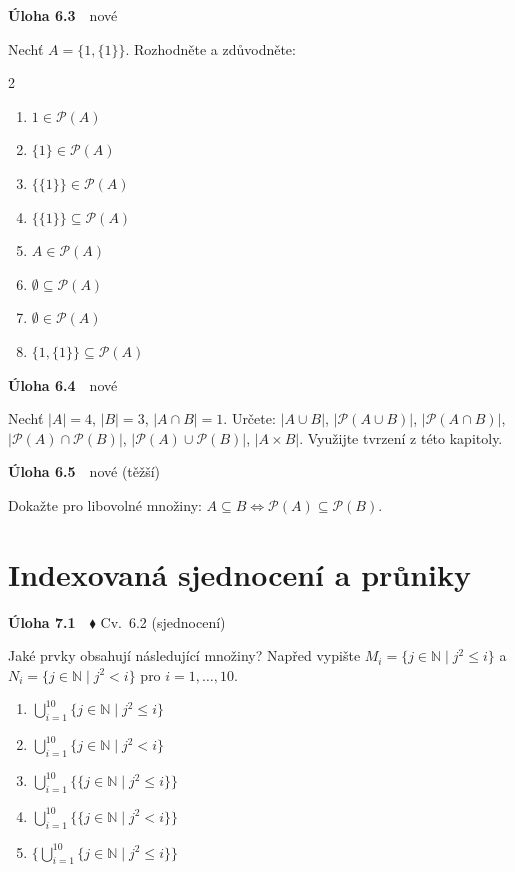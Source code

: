 \documentclass[11pt,a4paper]{article}
\newcommand{\N}{\mathbb N}\newcommand{\Z}{\mathbb Z}\newcommand{\Pot}{\mathcal P}
\newenvironment{pol}{\begin{enumerate}[label=(\alph*),leftmargin=2em,itemsep=3pt]}{\end{enumerate}}
\newenvironment{dvasl}{\begin{multicols}{2}\begin{enumerate}[label=(\alph*),leftmargin=2em,itemsep=3pt]}{\end{enumerate}\end{multicols}}
\newenvironment{uloha}[2]{\Needspace{6\baselineskip}\par\vspace{6pt}\noindent\textbf{Úloha #1}\ \ {\footnotesize\color{gray}#2}\par\vspace{2pt}}{\par\vspace{4pt}}
\begin{document}
\begin{uloha}{6.3}{nové}
Nechť $A=\{1,\{1\}\}$. Rozhodněte a zdůvodněte:
\begin{dvasl}
  \item $1\in\mathcal P(A)$
  \item $\{1\}\in\mathcal P(A)$
  \item $\{\{1\}\}\in\mathcal P(A)$
  \item $\{\{1\}\}\subseteq\mathcal P(A)$
  \item $A\in\mathcal P(A)$
  \item $\emptyset\subseteq\mathcal P(A)$
  \item $\emptyset\in\mathcal P(A)$
  \item $\{1,\{1\}\}\subseteq\mathcal P(A)$
\end{dvasl}

\end{uloha}

\begin{uloha}{6.4}{nové}
Nechť $|A|=4$, $|B|=3$, $|A\cap B|=1$. Určete: $|A\cup B|$, $|\mathcal P(A\cup B)|$, $|\mathcal P(A\cap B)|$, $|\mathcal P(A)\cap\mathcal P(B)|$, $|\mathcal P(A)\cup\mathcal P(B)|$, $|A\times B|$. Využijte tvrzení z této kapitoly.

\end{uloha}

\begin{uloha}{6.5}{nové (těžší)}
Dokažte pro libovolné množiny: $A\subseteq B\iff\mathcal P(A)\subseteq\mathcal P(B)$.


\end{uloha}

\section{Indexovaná sjednocení a průniky}

\begin{uloha}{7.1}{$\blacklozenge$ Cv.~6.2 (sjednocení)}
Jaké prvky obsahují následující množiny? Napřed vypište $M_i=\{j\in\N\mid j^2\le i\}$ a $N_i=\{j\in\N\mid j^2<i\}$ pro $i=1,\dots,10$.
\begin{pol}
  \item $\bigcup_{i=1}^{10}\{j\in\N\mid j^2\le i\}$
  \item $\bigcup_{i=1}^{10}\{j\in\N\mid j^2< i\}$
  \item $\bigcup_{i=1}^{10}\{\{j\in\N\mid j^2\le i\}\}$
  \item $\bigcup_{i=1}^{10}\{\{j\in\N\mid j^2< i\}\}$
  \item $\big\{\bigcup_{i=1}^{10}\{j\in\N\mid j^2\le i\}\big\}$
\end{pol}

\end{uloha}
\end{document}
